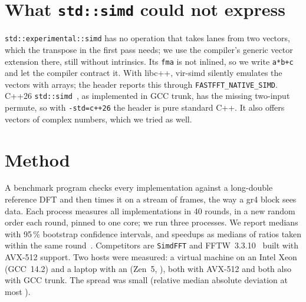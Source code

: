 \documentclass[10pt,a4paper,twocolumn]{article}
\newcommand{\code}[1]{\texttt{#1}}
\begin{document}
\section{What \texttt{std::simd} could not express}\label{sec:simd}
\code{std::experimental::simd} has no operation that takes lanes from two vectors, which the transpose in the first
pass needs; we use the compiler's generic vector extension there, still without intrinsics. Its \code{fma} is not
inlined, so we write \code{a*b+c} and let the compiler contract it. With libc++, vir-simd silently emulates the vectors
with arrays; the header reports this through \code{FASTFFT\_NATIVE\_SIMD}. C++26 \code{std::simd}~\cite{p1928}, as
implemented in GCC trunk, has the missing two-input permute, so with \code{-std=c++26} the header is pure standard C++.
It also offers vectors of complex numbers, which we tried as well.

\section{Method}\label{sec:method}
A benchmark program checks every implementation against a long-double reference DFT and then times it on a stream of
frames, the way a gr4 block sees data. Each process measures all implementations in 40 rounds, in a new random order
each round, pinned to one core; we run three processes. We report medians with 95\,\% bootstrap confidence intervals,
and speedups as medians of ratios taken within the same round~\cite{efron,hoefler}. Competitors are \code{SimdFFT} and
FFTW~3.3.10~\cite{fftw} built with AVX-512 support. Two hosts were measured: a virtual machine on an Intel Xeon
(GCC~14.2) and a laptop with an \TwoCPU{} (Zen~5, \TwoCompiler{}), both with AVX-512 and both also with GCC
trunk. The spread was small (relative median absolute deviation at most \WorstMAD{}).
\end{document}
